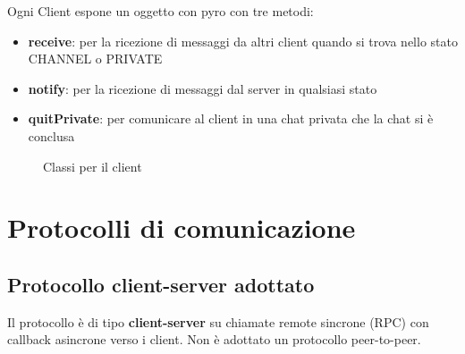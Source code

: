 \documentclass[11pt,a4paper]{article}
\begin{document}
Ogni Client espone un oggetto con pyro con tre metodi:
\begin{itemize}
    \item \textbf{receive}: per la ricezione di messaggi da altri client quando si trova nello stato CHANNEL o PRIVATE
    \item \textbf{notify}: per la ricezione di messaggi dal server in qualsiasi stato
    \item \textbf{quitPrivate}: per comunicare al client in una chat privata che la chat si è conclusa
\end{itemize}

\begin{figure}[H]
    \centering
    \caption{Classi per il client}
    \label{fig:placeholder}
\end{figure}

\section{Protocolli di comunicazione}
\subsection{Protocollo client-server adottato}
Il protocollo è di tipo \textbf{client-server} su chiamate remote sincrone (RPC) con callback asincrone verso i client. Non è adottato un protocollo peer-to-peer.
\end{document}
